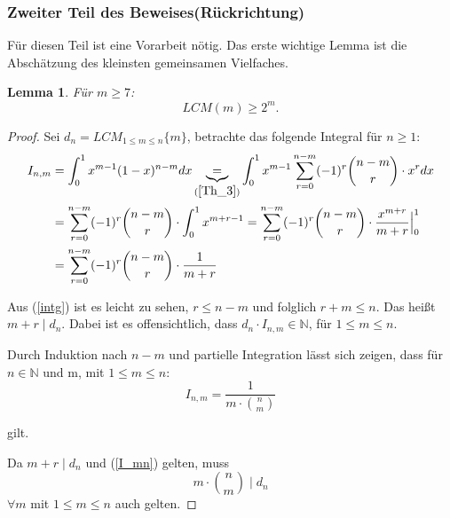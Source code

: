 \documentclass[12pt,oneside]{article}
\newtheorem{lemma}[theorem]{Lemma}
\theoremstyle{remark}
\theoremstyle{definition}
\begin{document}
\subsubsection{Zweiter Teil des Beweises(Rückrichtung)}
Für diesen Teil ist eine Vorarbeit nötig. Das erste wichtige Lemma ist die Abschätzung des kleinsten gemeinsamen Vielfaches.


\begin{lemma}\label{lemma_1}
Für $m \geq 7$:\newline
\begin{equation}
    LCM(m) \geq 2^m.  
\end{equation}
\end{lemma}

\begin{proof}
Sei $d_{n} = LCM_{1 \leq m \leq n}{\{m\}}$, betrachte das folgende Integral für $n \geq 1$:\newline
\begin{equation}\label{intg}
    \begin{split}
      \begin{aligned}
        I_{n,m}&= \int_{0}^{1} x^{m-1} (1-x)^{n - m} dx \underbrace{=}_{(\ref{Th_3})} \int_{0}^{1} x^{m-1} \sum_{r = 0}^{n - m} (-1)^r {n - m\choose r} \cdot x^r dx \\
        &= \sum_{r = 0}^{n - m}(-1)^r {n - m \choose r} \cdot \int_{0}^{1} x^{m + r - 1} 
        = \sum_{r = 0}^{n - m} (-1)^r {n - m \choose r} \cdot \frac{x^{m+r}}{m+r}\Big|_0^1\\
        &= \sum_{r = 0}^{n - m} (-1)^r {n - m \choose r} \cdot \frac{1}{m + r}
      \end{aligned}
    \end{split}
\end{equation}

Aus (\ref{intg}) ist es leicht zu sehen, $r \leq n - m $ und folglich $ r + m \leq n $. Das heißt $m + r \mid d_{n}$. Dabei ist es offensichtlich, dass $d_{n} \cdot I_{n,m} \in \mathbb{N}$, für $1 \leq m \leq n$.

Durch Induktion nach $n - m$ und partielle Integration lässt sich zeigen, dass für $n \in \mathbb{N}$ und m, mit $1 \leq m \leq n$:
\begin{equation}\label{I_mn}
    I_{n,m} = \frac{1}{m \cdot {n \choose m}}
\end{equation}

gilt.\newline\newline


Da $m + r \mid d_{n} $ und (\ref{I_mn}) gelten, muss
\begin{equation}
    m \cdot {n \choose m} \mid d_{n}
\end{equation}
$\forall m $ mit $1 \leq m \leq n $ auch gelten.\newline


\end{proof}
\end{document}
